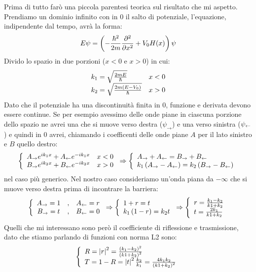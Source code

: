 Prima di tutto far\`o una piccola parentesi teorica sul risultato che mi aspetto. Prendiamo un dominio infinito con in 0 il salto di potenziale, l'equazione, indipendente dal tempo, avr\`a la forma:
\begin{equation}
	E\psi = \lrt{-\frac{\hbar^2}{2m}\pde{^2}{x^2}+V_0H(x)}\psi
\end{equation}
Divido lo spazio in due porzioni ($x<0$ e $x>0$) in cui:
\begin{equation}\label{eq:Ks}
	\begin{array}{lr}
	k_1 = \sqrt\frac{2m E}{\hbar}&x<0\\
	k_2 = \sqrt\frac{2m \lrt{E-V_0}}{\hbar}&x>0
	\end{array}
\end{equation}
Dato che il potenziale ha una discontinuit\`a finita in $0$, funzione e derivata devono essere continue. Se per esempio avessimo delle onde piane in ciascuna porzione dello spazio ne avrei una che si muove verso destra ($\psi_\to$) e una verso sinistra ($\psi_\from$) e quindi in 0 avrei, chiamando i coefficenti delle onde piane $A$ per il lato sinistro e $B$ quello destro:
\begin{equation}
	\lr\{.{\begin{array}{lr}
	A_\to e^{ik_1x} + A_\from e^{-ik_1x}	&	x<0\\
	B_\to e^{ik_2x} + B_\from e^{-ik_2x}	&	x>0
	\end{array}}\Rightarrow
	\lr\{.{\begin{array}{l}
	A_\to+A_\from = B_\to+B_\from\\
	k_1\lrt{A_\to-A_\from} = k_2\lrt{B_\to-B_\from}
	\end{array}}
\end{equation}
nel caso pi\`u generico. Nel nostro caso consideriamo un'onda piana da $-\infty$ che si muove verso destra prima di incontrare la barriera:
\begin{equation}
\lr\{.{\begin{array}{ccc}
A_\to = 1&,&
A_\from = r\\
B_\to = t&,&
B_\from=0
\end{array}} \Rightarrow\lr\{.{\begin{array}{l}
	1+r = t\\
	k_1 \lrt{1-r} = k_2 t
\end{array}} \Rightarrow\lr\{.{\begin{array}{l}
	r = \frac{k_1-k_2}{k1+k_2}\\
	t = \frac{2k_1}{k1+k_2}
\end{array}}
\end{equation}
Quelli che mi interessano sono per\`o il coefficiente di riflessione e trasmissione, dato che stiamo parlando di funzioni con norma L2 sono:
\begin{equation}
\lr\{.{\begin{array}{l}
	R = \lr||{r}^2 = \frac{\lrt{k_1-k_2}^2}{\lrt{k1+k_2}^2}\\
	T = 1-R = \lr||{t}^2\frac{k_2}{k_1} = \frac{4 k_1 k_2}{\lrt{k1+k_2}^2}
\end{array}}
\end{equation}

